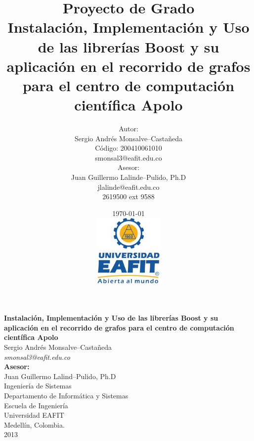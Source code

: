 \documentclass[twoside,letterpaper,12pt]{report}
\title{
	Proyecto de Grado\\[0.5cm]
	Instalación, Implementación y Uso de las librerías Boost y su aplicación en el recorrido de grafos para el centro de computación científica Apolo
}
\author{
	Autor:\\[0.3cm]
	Sergio Andrés Monsalve--Castañeda\\
	Código: 200410061010\\
	smonsal3@eafit.edu.co\\[0.7cm]
	Asesor: \\[0.3cm]
	Juan Guillermo Lalinde--Pulido, Ph.D\\
	jlalinde@eafit.edu.co\\
	2619500 ext 9588%
}
\date{
	\today \\[0.5cm]
	\includegraphics[width=0.25\textwidth]{aux/logo_eafit} 
}
\begin{document}

\maketitle


\thispagestyle{empty} %
\begin{center}
\textbf{{\Large Instalación, Implementación y Uso de las librerías Boost y su aplicación en el recorrido de grafos para el centro de computación científica Apolo}}\\[5cm]
{\Large Sergio Andrés Monsalve--Castañeda} \\ {\large \textit{smonsal3@eafit.edu.co}}\\[5cm]

{\large \textbf{Asesor:} \\Juan Guillermo Lalind--Pulido, Ph.D}\\[5cm]

Ingeniería de Sistemas \\ Departamento de Informática y Sistemas  \\ Escuela de Ingeniería \\ Universidad EAFIT \\ Medellín, Colombia.\\
2013

\end{center}
\pagebreak

\end{document}
